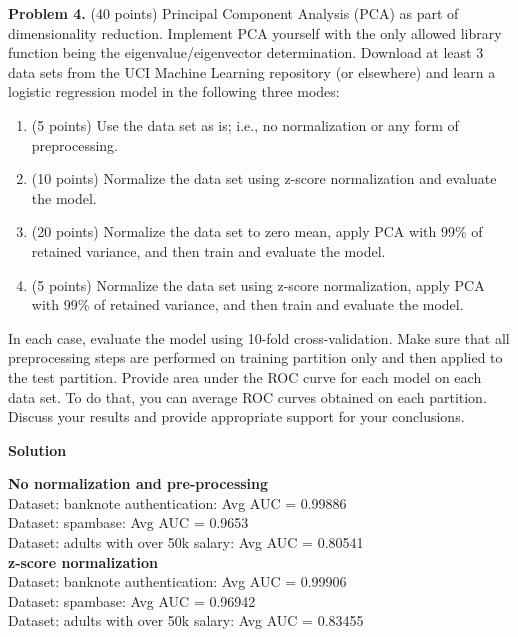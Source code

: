 \documentclass[twoside]{article}
\begin{document}
\newpage
\textbf{Problem 4.} (40 points) Principal Component Analysis (PCA) as part of dimensionality reduction. Implement PCA yourself with the only allowed library function being the eigenvalue/eigenvector determination. Download at least 3 data sets from the UCI Machine Learning repository (or elsewhere) and learn a logistic regression model in the following three modes:

\begin{enumerate}
\item (5 points) Use the data set as is; i.e., no normalization or any form of preprocessing.
\item (10 points) Normalize the data set using z-score normalization and evaluate the model.
\item (20 points) Normalize the data set to zero mean, apply PCA with 99\% of retained variance, and then train and evaluate the model.
\item (5 points) Normalize the data set using z-score normalization, apply PCA with 99\% of retained variance, and then train and evaluate the model.
\end{enumerate}
In each case, evaluate the model using 10-fold cross-validation. Make sure that all preprocessing steps are performed on training partition only and then applied to the test partition. Provide area under the ROC curve for each model on each data set. To do that, you can average ROC curves obtained on each partition. Discuss your results and provide appropriate support for your conclusions.

\vspace{1em}

\textbf{Solution}

\textbf{No normalization and pre-processing}\\
Dataset: banknote authentication: Avg AUC = 0.99886\\

Dataset: spambase: Avg AUC = 0.9653\\

Dataset: adults with over 50k salary: Avg AUC = 0.80541\\


\textbf{z-score normalization}\\
Dataset: banknote authentication: Avg AUC = 0.99906\\

Dataset: spambase: Avg AUC = 0.96942\\

Dataset: adults with over 50k salary: Avg AUC = 0.83455\\
\end{document}
